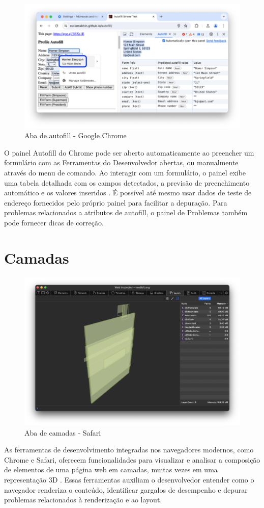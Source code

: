 \begin{figure}[h!]
    \centering
    \includegraphics[width=0.7\linewidth]{assets/tools/chrome-autofill.png}
    \caption{Aba de autofill - Google Chrome }
    \label{fig:enter-label}
\end{figure}

O painel Autofill do Chrome pode ser aberto automaticamente ao preencher um formulário com as Ferramentas do Desenvolvedor abertas, ou manualmente através do menu de comando. Ao interagir com um formulário, o painel exibe uma tabela detalhada com os campos detectados, a previsão de preenchimento automático e os valores inseridos \cite{chrome}. É possível até mesmo usar dados de teste de endereço fornecidos pelo próprio painel para facilitar a depuração. Para problemas relacionados a atributos de autofill, o painel de Problemas também pode fornecer dicas de correção.

\section{Camadas}
\begin{figure}[h!]
    \centering
    \includegraphics[width=0.7\linewidth]{assets/tools/safari-layers.png}
    \caption{Aba de camadas - Safari }
    \label{fig:enter-label}
\end{figure}
As ferramentas de desenvolvimento integradas nos navegadores modernos, como Chrome e Safari, oferecem funcionalidades para visualizar e analisar a composição de elementos de uma página web em camadas, muitas vezes em uma representação 3D \cite{apple, chrome}. Essas ferramentas auxiliam o desenvolvedor entender como o navegador renderiza o conteúdo, identificar gargalos de desempenho e depurar problemas relacionados à renderização e ao layout.

